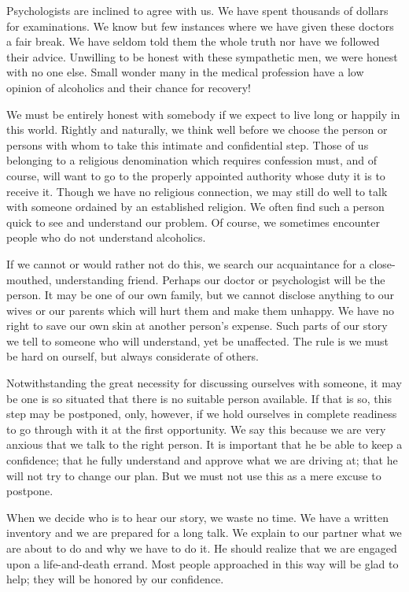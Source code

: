 \begin{biblechapter}
Psychologists are inclined to agree with us.  We have spent thousands of dollars for examinations.  We know but few instances where we have given these doctors a fair break.  We have seldom told them the whole truth nor have we followed their advice.  Unwilling to be honest with these sympathetic men, we were honest with no one else.  Small wonder many in the medical profession have a low opinion of alcoholics and their chance for recovery!

We must be entirely honest with somebody if we expect to live long or happily in this world.  Rightly and naturally, we think well before we choose the person or persons with whom to take this intimate and confidential step.  Those of us belonging to a religious denomination which requires confession must, and of course, will want to go to the properly appointed authority whose duty it is to receive it.  Though we have no religious connection, we may still do well to talk with someone ordained by an established religion.  We often find such a person quick to see and understand our problem.  Of course, we sometimes encounter people who do not understand alcoholics.

If we cannot or would rather not do this, we search our acquaintance for a close-mouthed, understanding friend.  Perhaps our doctor or psychologist will be the person.  It may be one of our own family, but we cannot disclose anything to our wives or our parents which will hurt them and make them unhappy.  We have no right to save our own skin at another person's expense.  Such parts of our story we tell to someone who will understand, yet be unaffected.  The rule is we must be hard on ourself, but always considerate of others.

Notwithstanding the great necessity for discussing ourselves with someone, it may be one is so situated that there is no suitable person available.  If that is so, this step may be postponed, only, however, if we hold ourselves in complete readiness to go through with it at the first opportunity.  We say this because we are very anxious that we talk to the right person.  It is important that he be able to keep a confidence; that he fully understand and approve what we are driving at; that he will not try to change our plan.  But we must not use this as a mere excuse to postpone.

When we decide who is to hear our story, we waste no time.  We have a written inventory and we are prepared for a long talk.  We explain to our partner what we are about to do and why we have to do it.  He should realize that we are engaged upon a life-and-death errand.  Most people approached in this way will be glad to help; they will be honored by our confidence.


\end{biblechapter}
